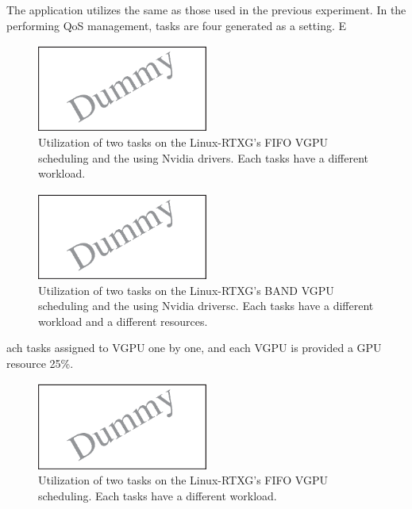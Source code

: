 The application utilizes the same as those used in the previous experiment.
In the performing QoS management, tasks are four generated as a setting.
E
\begin{figure}[t]
\begin{center}
\includegraphics[width=0.5\textwidth]{img/fifo_rtx_nvidia}
\caption{Utilization of two tasks on the Linux-RTXG's FIFO VGPU scheduling and the using Nvidia drivers. Each tasks have a different workload. }
\end{center}
\label{fig:fifo_rtx_nvidia}
\end{figure}

\begin{figure}[t]
\begin{center}
\includegraphics[width=0.5\textwidth]{img/band_rtx_nvidia}
\caption{Utilization of two tasks on the Linux-RTXG's BAND VGPU scheduling and the using Nvidia driversc. Each tasks have a different workload and a different resources.}
\end{center}
\label{fig:band_rtx_nvidia}
\end{figure}ach tasks assigned to VGPU one by one, and each VGPU is provided a GPU resource 25\%.

\begin{figure}[t]
\begin{center}
\includegraphics[width=0.5\textwidth]{img/fifo_rtx}
\caption{Utilization of two tasks on the Linux-RTXG's FIFO VGPU scheduling. Each tasks have a different workload. }
\end{center}
\label{fig:fifo_rtx}
\end{figure}

